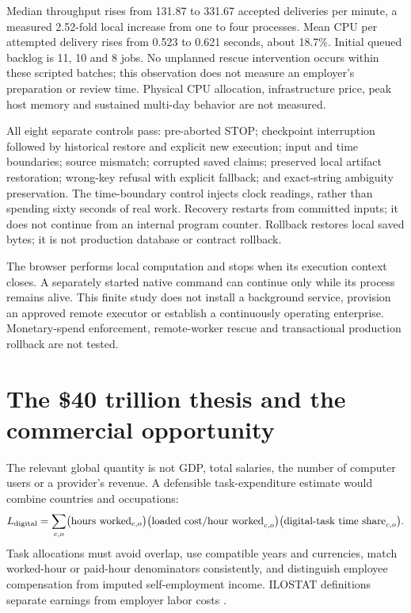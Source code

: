 \documentclass[11pt,a4paper]{article}
\begin{document}
Median throughput rises from 131.87 to 331.67 accepted deliveries per minute, a measured 2.52-fold local increase from one to four processes. Mean CPU per attempted delivery rises from 0.523 to 0.621 seconds, about 18.7\%. Initial queued backlog is 11, 10 and 8 jobs. No unplanned rescue intervention occurs within these scripted batches; this observation does not measure an employer's preparation or review time. Physical CPU allocation, infrastructure price, peak host memory and sustained multi-day behavior are not measured.

All eight separate controls pass: pre-aborted STOP; checkpoint interruption followed by historical restore and explicit new execution; input and time boundaries; source mismatch; corrupted saved claims; preserved local artifact restoration; wrong-key refusal with explicit fallback; and exact-string ambiguity preservation. The time-boundary control injects clock readings, rather than spending sixty seconds of real work. Recovery restarts from committed inputs; it does not continue from an internal program counter. Rollback restores local saved bytes; it is not production database or contract rollback.

The browser performs local computation and stops when its execution context closes. A separately started native command can continue only while its process remains alive. This finite study does not install a background service, provision an approved remote executor or establish a continuously operating enterprise. Monetary-spend enforcement, remote-worker rescue and transactional production rollback are not tested.

\section{The \$40 trillion thesis and the commercial opportunity}

The relevant global quantity is not GDP, total salaries, the number of computer users or a provider's revenue. A defensible task-expenditure estimate would combine countries and occupations:
\begin{equation}
L_{\rm digital}=\sum_{c,o}
\bigl(\text{hours worked}_{c,o}\bigr)
\bigl(\text{loaded cost/hour worked}_{c,o}\bigr)
\bigl(\text{digital-task time share}_{c,o}\bigr).
\end{equation}
Task allocations must avoid overlap, use compatible years and currencies, match worked-hour or paid-hour denominators consistently, and distinguish employee compensation from imputed self-employment income. ILOSTAT definitions separate earnings from employer labor costs \citep{ilostat_wagedefinitions,ilo2026labourmetadata}.
\end{document}
